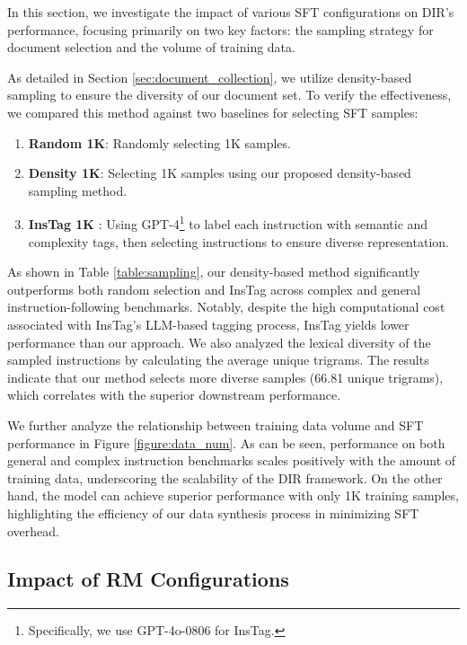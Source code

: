 In this section, we investigate the impact of various SFT configurations on DIR's performance, focusing primarily on two key factors: the sampling strategy for document selection and the volume of training data.

As detailed in Section \ref{sec:document_collection}, we utilize density-based sampling to ensure the diversity of our document set. To verify the effectiveness, we compared this method against two baselines for selecting SFT samples:

\begin{enumerate}[itemsep=1mm, parsep=0pt, leftmargin=*]
    \item \textbf{Random 1K}: Randomly selecting 1K samples.
    \item \textbf{Density 1K}: Selecting 1K samples using our proposed density-based sampling method.
    \item \textbf{InsTag 1K} \citep{Lu2023InsTagIT}: Using GPT-4\footnote{Specifically, we use GPT-4o-0806 for InsTag.} to label each instruction with semantic and complexity tags, then selecting instructions to ensure diverse representation.
\end{enumerate}

As shown in Table \ref{table:sampling}, our density-based method significantly outperforms both random selection and InsTag across complex and general instruction-following benchmarks. Notably, despite the high computational cost associated with InsTag's LLM-based tagging process, InsTag yields lower performance than our approach. We also analyzed the lexical diversity of the sampled instructions by calculating the average unique trigrams. The results indicate that our method selects more diverse samples (66.81 unique trigrams), which correlates with the superior downstream performance.

We further analyze the relationship between training data volume and SFT performance in Figure \ref{figure:data_num}. As can be seen, performance on both general and complex instruction benchmarks scales positively with the amount of training data, underscoring the scalability of the DIR framework. On the other hand, the model can achieve superior performance with only 1K training samples, highlighting the efficiency of our data synthesis process in minimizing SFT overhead.

\subsection{Impact of RM Configurations}

